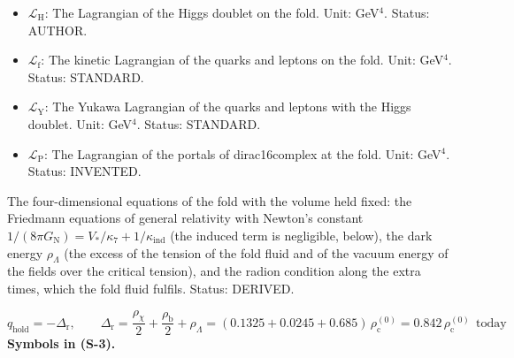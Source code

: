 \documentclass[
  10pt,
]{article}
\begin{document}
\begin{itemize}
  in the state of the medium (the vacuum, a plasma, the Kohn-Sham
  state). Status: STANDARD.
\item
  \(\mathcal{L}_{\mathrm{H}}\): The Lagrangian of the Higgs doublet on
  the fold. Unit: GeV\(^4\). Status: AUTHOR.
\item
  \(\mathcal{L}_{\mathrm{f}}\): The kinetic Lagrangian of the quarks and
  leptons on the fold. Unit: GeV\(^4\). Status: STANDARD.
\item
  \(\mathcal{L}_{\mathrm{Y}}\): The Yukawa Lagrangian of the quarks and
  leptons with the Higgs doublet. Unit: GeV\(^4\). Status: STANDARD.
\item
  \(\mathcal{L}_{\mathrm{P}}\): The Lagrangian of the portals of
  dirac16complex at the fold. Unit: GeV\(^4\). Status: INVENTED.
\end{itemize}

The four-dimensional equations of the fold with the volume held fixed:
the Friedmann equations of general relativity with Newton's constant
\(1/(8\pi G_{\mathrm{N}}) = V_*/\kappa_7 + 1/\kappa_{\mathrm{ind}}\)
(the induced term is negligible, below), the dark energy
\(\rho_\Lambda\) (the excess of the tension of the fold fluid and of the
vacuum energy of the fields over the critical tension), and the radion
condition along the extra times, which the fold fluid fulfils. Status:
DERIVED.

\[
q_{\mathrm{hold}} = -\Delta_{\mathrm{r}},\qquad
\Delta_{\mathrm{r}} = \frac{\rho_\chi}{2} + \frac{\rho_{\mathrm{b}}}{2} + \rho_\Lambda = (0.1325 + 0.0245 + 0.685)\,\rho_{\mathrm{c}}^{(0)}
= 0.842\,\rho_{\mathrm{c}}^{(0)}\ \ \text{today} \tag{S-3}
\] \textbf{Symbols in (S-3).}
\end{document}
